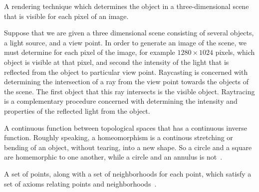 

{%
    A rendering technique which determines the object in a three-dimensional scene that is visible for each pixel of an image.

    Suppose that we are given a three dimensional scene consisting of several objects, a light source, and a view point.
    In order to generate an image of the scene, we must determine for each pixel of the image, for example \( 1280 \times 1024\) pixels, which object is visible at that pixel, and second the intensity of the light that is reflected from the object to particular view point.
    Raycasting is concerned with determining the intersection of a ray from the view point towards the objects of the scene.
    The first object that this ray intersects is the visible object.
    Raytracing is a complementary procedure concerned with determining the intensity and properties of the reflected light from the object.
}


{
   A continuous function between topological spaces that has a continuous inverse function.
   Roughly speaking, a homeomorphism is a continous stretching or bending of an object, without tearing, into a new shape. 
   So a circle and a square are homemorphic to one another, while a circle and an annulus is not~\cite{morris1989}.
}

{
    A set of points, along with a set of neighborhoods for each point, which satisfy a set of axioms relating points and neighborhoods~\cite{morris1989}.
}
